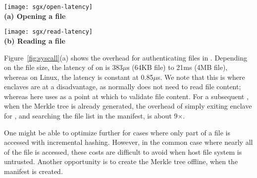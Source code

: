 \begin{figure*}[t!]
\centering
\begin{minipage}{.49\textwidth}
\centering
\footnotesize
\vspace{6pt}
\texttt{[image: sgx/open-latency]}\\
\vspace{3pt}
{\bf (a) Opening a file}
\vspace{6pt}
\end{minipage}
\begin{minipage}{.49\textwidth}
\centering
\footnotesize
\vspace{6pt}
\texttt{[image: sgx/read-latency]}\\
\vspace{3pt}
{\bf (b) Reading a file}
\vspace{6pt}
\end{minipage}
\caption{Latency of some expensive system calls in \graphenesgx{}, including opening and reading a secured (authenticated) file, and forking a new process. The results are compared with native Linux and \graphene{}.}
\label{fig:eval:sgx-shield-syscall}
\end{figure*}


Figure~\ref{fig:syscall}(a)
shows the overhead for authenticating files in .
Depending on the file size, the latency of  on \graphenesgx{} is 383$\mu$s (64KB file) to 21ms (4MB file), whereas on Linux, the latency is constant at 0.85$\mu$s.
We note that this is where enclaves are at a disadvantage, as  
normally does not need to read file content; whereas here \graphenesgx{} uses 
as a point at which to validate file content.
For a subsequent , when the Merkle tree is already generated, the overhead of simply exiting enclave for , and searching the file list in the manifest, is about 9$\times$.


One might be able to optimize further for cases where only part of a file is accessed
with incremental hashing.  However, in the common case where nearly all of the file is accessed,
these costs are difficult to avoid when host file system is untrusted.
Another opportunity 
is to create the Merkle tree offline, when the manifest is created.



